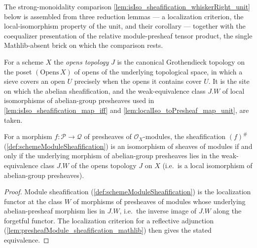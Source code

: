 The strong-monoidality comparison \cref{lem:isIso_sheafification_whiskerRight_unit}
below is assembled from three reduction lemmas --- a localization criterion, the
local-isomorphism property of the unit, and their corollary --- together with the
coequalizer presentation of the relative module-presheaf tensor product, the single
Mathlib-absent brick on which the comparison rests.

\begin{definition}

  \label{def:snap_opensTopology}
  For a scheme \(X\) the \emph{opens topology} \(J\) is the canonical Grothendieck
  topology on the poset \((\mathrm{Opens}\,X)\) of opens of the underlying
  topological space, in which a sieve covers an open \(U\) precisely when the opens
  it contains cover \(U\). It is the site on which the abelian sheafification, and
  the weak-equivalence class \(J.W\) of local isomorphisms of abelian-group
  presheaves used in \cref{lem:isIso_sheafification_map_iff} and
  \cref{lem:localIso_toPresheaf_map_unit}, are taken.
\end{definition}

\begin{lemma}
  \label{lem:isIso_sheafification_map_iff}
  For a morphism \(f : \mathcal{P} \to \mathcal{Q}\) of presheaves of
  \(\mathcal{O}_X\)-modules, the sheafification \((f)^{\#}\)
  (\cref{def:schemeModuleSheafification}) is an isomorphism of sheaves of modules if
  and only if the underlying morphism of abelian-group presheaves lies in the
  weak-equivalence class \(J.W\) of the opens topology \(J\) on \(X\) (i.e.\ is a
  local isomorphism of abelian-group presheaves).
\end{lemma}

\begin{proof}
  \leanok
  Module sheafification (\cref{def:schemeModuleSheafification}) is the localization
  functor at the class \(W\) of morphisms of presheaves of modules whose underlying
  abelian-presheaf morphism lies in \(J.W\), i.e.\ the inverse image of \(J.W\) along
  the forgetful functor. The localization criterion for a reflective adjunction
  (\cref{lem:presheafModule_sheafification_mathlib}) then gives the stated
  equivalence.
\end{proof}

